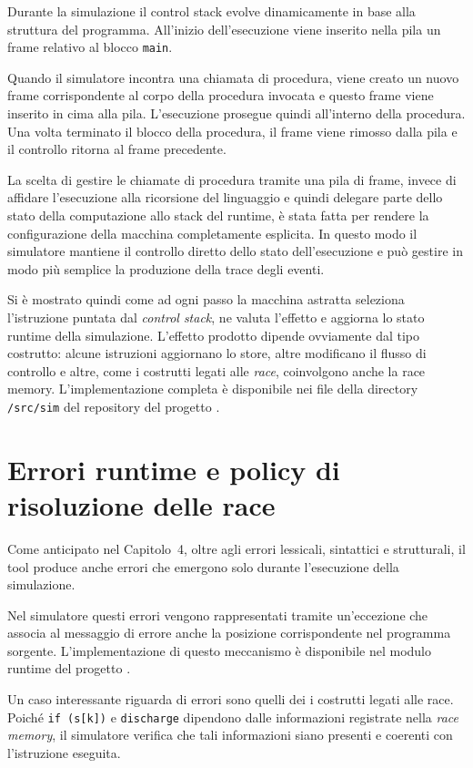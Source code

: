 Durante la simulazione il control stack evolve dinamicamente in base alla struttura del programma. All’inizio dell’esecuzione viene inserito nella pila un frame relativo al blocco \texttt{main}.

Quando il simulatore incontra una chiamata di procedura, viene creato un nuovo frame corrispondente al corpo della procedura invocata e questo frame viene inserito in cima alla pila. L’esecuzione prosegue quindi all’interno della procedura. Una volta terminato il blocco della procedura, il frame viene rimosso dalla pila e il controllo ritorna al frame precedente.

La scelta di gestire le chiamate di procedura tramite una pila di frame, invece di affidare l’esecuzione alla ricorsione del linguaggio e quindi delegare parte dello stato della computazione allo stack del runtime, è stata fatta per rendere la configurazione della macchina completamente esplicita. In questo modo il simulatore mantiene il controllo diretto dello stato dell’esecuzione e può gestire in modo più semplice la produzione della trace degli eventi.

Si è mostrato quindi come ad ogni passo la macchina astratta seleziona l’istruzione puntata dal \textit{control stack}, ne valuta l’effetto e aggiorna lo stato runtime della simulazione. L’effetto prodotto dipende ovviamente dal tipo costrutto: alcune istruzioni aggiornano lo store, altre modificano il flusso di controllo e altre, come i costrutti legati alle \textit{race}, coinvolgono anche la race memory. L’implementazione completa è disponibile nei file della directory \texttt{/src/sim} del repository del progetto \cite{rcparserrepo}.

\section{Errori runtime e policy di risoluzione delle race}

Come anticipato nel Capitolo~4, oltre agli errori lessicali, sintattici e strutturali, il tool produce anche errori che emergono solo durante l’esecuzione della simulazione.

Nel simulatore questi errori vengono rappresentati tramite un’eccezione che associa al messaggio di errore anche la posizione corrispondente nel programma sorgente. L’implementazione di questo meccanismo è disponibile nel modulo runtime del progetto \cite{rcparserrepo}.

Un caso interessante riguarda di errori sono quelli dei i costrutti legati alle race. Poiché \texttt{if (s[k])} e \texttt{discharge} dipendono dalle informazioni registrate nella \textit{race memory}, il simulatore verifica che tali informazioni siano presenti e coerenti con l’istruzione eseguita. 

